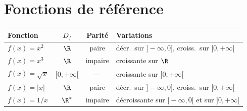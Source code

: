\section{Fonctions de r\'ef\'erence}

\begin{center}
\renewcommand{\arraystretch}{1.5}
\begin{tabular}{|l|c|c|l|}
\hline
\rowcolor{BN!10}
Fonction & $D_f$ & Parit\'e & Variations \\
\hline
$f(x)=x^2$   & $\R$ & paire   & d\'ecr.\ sur $]-\infty,0]$, croiss.\ sur $[0,+\infty[$ \\
$f(x)=x^3$   & $\R$ & impaire & croissante sur $\R$ \\
$f(x)=\sqrt{x}$ & $[0,+\infty[$ & --- & croissante sur $[0,+\infty[$ \\
$f(x)=|x|$   & $\R$ & paire   & d\'ecr.\ sur $]-\infty,0]$, croiss.\ sur $[0,+\infty[$ \\
$f(x)=1/x$   & $\R^*$ & impaire & d\'ecroissante sur $]-\infty,0[$ et sur $]0,+\infty[$ \\
\hline
\end{tabular}
\end{center}

